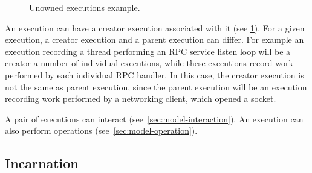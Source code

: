 
\begin{figure}[t]
    \centering
{}
    \caption{Unowned executions example.}
    \label{fig:unowned-execution}
\end{figure}

An execution can have a creator execution associated with it (see \cref{fig:unowned-execution}). For a given execution, a creator execution and a parent execution can differ. For example an execution recording a thread performing an RPC service listen loop will be a creator a number of individual executions, while these executions record work performed by each individual RPC handler. In this case, the creator execution is not the same as parent execution, since the parent execution will be an execution recording work performed by a networking client, which opened a socket.

A pair of executions can interact (see~\cref{sec:model-interaction}). An execution can also perform operations (see~\cref{sec:model-operation}).

\subsection{Incarnation}\label{sec:model-incarnation}

